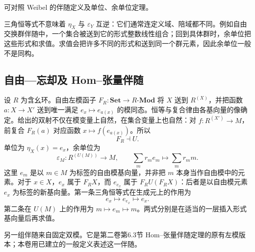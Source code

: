 可对照 Weibel 的伴随定义及单位、余单位定理\cite[A.6.1; Theorem A.6.2 and Exercise A.6.2]{Weibel1994HomologicalAlgebra}。

\ProseParagraphBreak
三角恒等式不意味着 \(\eta_X\) 与 \(\varepsilon_Y\) 互逆：它们通常连定义域、陪域都不同。例如自由交换群伴随中，一个集合被送到它的形式整数线性组合；回到具体群时，余单位把这些形式和求值。求值会把许多不同的形式和送到同一个群元素，因此余单位一般不是同构。

\subsection{自由—忘却及 Hom–张量伴随}
\label{b4:subsec:0303:03}

设 \(R\) 为含幺环。自由左模函子 \(F_R:\mathbf{Set}\rightarrow R\text{-}\mathbf{Mod}\) 将 \(X\) 送到 \(R^{(X)}\)，并把函数 \(a:X\rightarrow X'\) 送到唯一满足 \(e_x\mapsto e_{a(x)}\) 的模同态。恒等与复合律由各基向量的像确定。给出的双射不仅在模变量上自然，在集合变量上也自然：对 \(f:R^{(X')}\rightarrow M\)，前复合 \(F_R(a)\) 对应函数 \(x\mapsto f(e_{a(x)})\)。所以
\[
	F_R\dashv U.
\]
单位为 \(\eta_X(x)=e_x\)，余单位为
\[
	\varepsilon_M:R^{(U(M))}\longrightarrow M, \qquad\sum_mr_me_m\longmapsto\sum_mr_mm.
\]
这里 \(e_m\) 是以 \(m\in M\) 为标签的自由模基向量，并非把 \(m\) 本身当作自由模中的元素。对于 \(x\in X\)，\(e_x\) 属于 \(F_RX\)，而 \(e_{e_x}\) 属于 \(F_RU(F_RX)\)：后者是以自由模元素 \(e_x\) 为标签的新基向量。第一条三角恒等式在生成元上的作用为
\[
	e_x\longmapsto e_{e_x}\longmapsto e_x.
\]
第二条在 \(U(M)\) 上的作用为 \(m\mapsto e_m\mapsto m\)。两式分别是在适当的一层插入形式基向量后再求值。

\ProseParagraphBreak
另一组伴随来自固定双模。它是第二卷第6.3节 Hom–张量伴随定理的原有左模版本；本卷用已建立的一般定义表述这一伴随。

